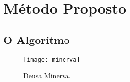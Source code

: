 \chapter{Método Proposto}

\section{O Algoritmo}

\begin{figure}[b]
\centering
\texttt{[image: minerva]}
\caption{Deusa Minerva.}
\label{fig:minerva}
\end{figure}
